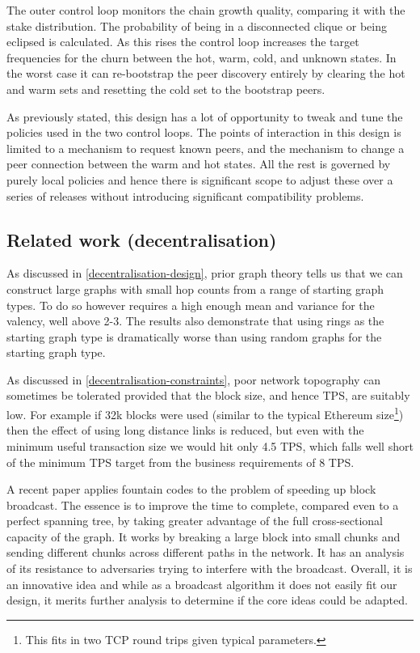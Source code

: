 \documentclass[11pt,a4paper]{article}
\begin{document}
The outer control loop monitors the chain growth quality, comparing it
with the stake distribution. The probability of being in a disconnected
clique or being eclipsed is calculated. As this rises the control loop
increases the target frequencies for the churn between the hot, warm,
cold, and unknown states. In the worst case it can re-bootstrap the peer
discovery entirely by clearing the hot and warm sets and resetting the
cold set to the bootstrap peers.

As previously stated, this design has a lot of opportunity to tweak and
tune the policies used in the two control loops. The points of
interaction in this design is limited to a mechanism to request known
peers, and the mechanism to change a peer connection between the warm
and hot states. All the rest is governed by purely local policies and
hence there is significant scope to adjust these over a series of
releases without introducing significant compatibility problems.

\subsection{Related work (decentralisation)}
\label{related-work-decentralisation}

As discussed in \cref{decentralisation-design}, prior graph theory 
\cite{Watts99} tells us that we can construct
large graphs with small hop counts from a range of starting graph types.
To do so however requires a high enough mean and variance for the
valency, well above 2-3. The results also demonstrate that using rings
as the starting graph type is dramatically worse than using random
graphs for the starting graph type.

As discussed in
\cref{decentralisation-constraints}, poor
network topography can sometimes be tolerated provided that the block
size, and hence TPS, are suitably low. For example if 32k blocks were
used (similar to the typical Ethereum size\footnote{This fits in two TCP
  round trips given typical parameters.}) then the effect of using long
distance links is reduced, but even with the minimum useful transaction
size we would hit only 4.5 TPS, which falls well short of the minimum
TPS target from the business requirements of 8 TPS.

A recent paper \cite{CBTBC19} applies fountain codes to the problem of
speeding up block broadcast. The essence is to improve the time to
complete, compared even to a perfect spanning tree, by taking greater
advantage of the full cross-sectional capacity of the graph. It works by
breaking a large block into small chunks and sending different chunks
across different paths in the network. It has an analysis of its
resistance to adversaries trying to interfere with the broadcast.
Overall, it is an innovative idea and while as a broadcast algorithm it
does not easily fit our design, it merits further analysis to determine
if the core ideas could be adapted.
\end{document}
